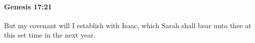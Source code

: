 
		\paragraph{Genesis 17:21} %
			\label{GENESIS-17-21}

			But my covenant will I establish with Isaac, which Sarah shall bear unto thee at this set time in the next year.


